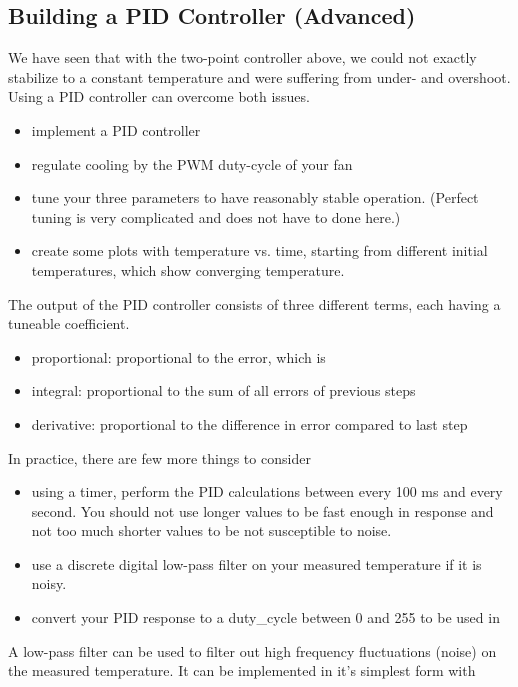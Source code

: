 \subsection{Building a PID Controller (Advanced)}
We have seen that with the two-point controller above, we could not exactly stabilize to a constant temperature and were suffering from under- and overshoot. Using a \ac{PID} controller can overcome both issues.
\begin{itemize}
	\item implement a \ac{PID} controller
	\item regulate cooling by the PWM duty-cycle of your fan
	\item tune your three parameters to have reasonably stable operation. (Perfect tuning is very complicated and does not have to done here.)
	\item create some plots with temperature vs. time, starting from different initial temperatures, which show converging temperature.
\end{itemize}

The output of the PID controller consists of three different terms, each having a tuneable coefficient.
\begin{itemize}
	\item proportional: proportional to the error, which is 
	\item integral: proportional to the sum of all errors of previous steps
	\item derivative: proportional to the difference in error compared to last step
\end{itemize}

In practice, there are few more things to consider
\begin{itemize}
    \item using a timer, perform the PID calculations between every 100 ms and every second. You should not use longer values to be fast enough in response and not too much shorter values to be not susceptible to noise.
    \item use a discrete digital low-pass filter on your measured temperature if it is noisy.
    \item convert your PID response to a duty\_cycle between 0 and 255 to be used in 
\end{itemize}

A low-pass filter can be used to filter out high frequency fluctuations (noise) on the measured temperature. It can be implemented in it's simplest form with

